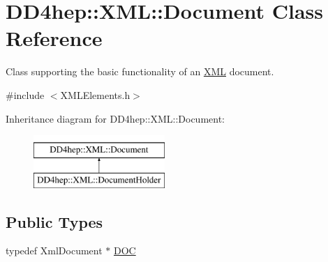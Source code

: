\hypertarget{class_d_d4hep_1_1_x_m_l_1_1_document}{}\section{D\+D4hep\+:\+:X\+ML\+:\+:Document Class Reference}
\label{class_d_d4hep_1_1_x_m_l_1_1_document}


Class supporting the basic functionality of an \hyperlink{namespace_d_d4hep_1_1_x_m_l}{X\+ML} document.  




{\ttfamily \#include $<$X\+M\+L\+Elements.\+h$>$}

Inheritance diagram for D\+D4hep\+:\+:X\+ML\+:\+:Document\+:\begin{figure}[H]
\begin{center}
\leavevmode
\includegraphics[height=2.000000cm]{class_d_d4hep_1_1_x_m_l_1_1_document}
\end{center}
\end{figure}
\subsection*{Public Types}
\begin{DoxyCompactItemize}
\item 
typedef Xml\+Document $\ast$ \hyperlink{class_d_d4hep_1_1_x_m_l_1_1_document_a685ff83de83e9b7b37e79ad846fc2387}{D\+OC}
\end{DoxyCompactItemize}
